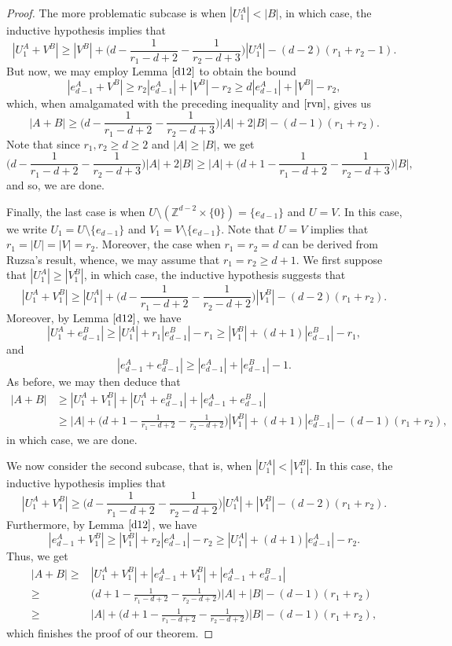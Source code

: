 \begin{proof}
The more problematic subcase is when $|U_1^A| < |B|$, in which case, the inductive hypothesis implies that
\[ |U_1^A + V^B| \geq |V^B| +  \bigg( d - \frac{1}{r_1 - d + 2} - \frac{1}{r_2 - d + 3} \bigg)|U_1^A| - (d-2)(r_1 + r_2-1).  \]
But now, we may employ Lemma $\ref{d12}$ to obtain the bound
\[ |e_{d-1}^A + V^B| \geq r_2 |e_{d-1}^A| + |V^B| - r_2 \geq d |e_{d-1}^A| + |V^B| - r_2, \]
which, when amalgamated with the preceding inequality and $\eqref{rvn}$, gives us
\[ |A+B| \geq \bigg( d - \frac{1}{r_1 - d + 2} - \frac{1}{r_2 - d + 3} \bigg)|A|+ 2|B| - (d-1)(r_1 + r_2). \]
Note that since $r_1, r_2 \geq d \geq 2$ and $|A| \geq |B|$, we get
\[ \bigg( d - \frac{1}{r_1 - d + 2} - \frac{1}{r_2 - d + 3} \bigg)|A|+ 2|B| \geq |A| + \bigg( d+1 - \frac{1}{r_1 - d + 2} - \frac{1}{r_2 - d + 3} \bigg)|B| , \]
and so, we are done.
\par

Finally, the last case is when $U \setminus (\mathbb{Z}^{d-2} \times \{0\}) =  \{e_{d-1}\}$ and $U = V$. In this case, we write $U_1 = U \setminus \{e_{d-1}\}$ and $V_1 = V \setminus \{e_{d-1}\}$. Note that $U=V$ implies that $r_1 = |U| = |V| = r_2$. Moreover, the case when $r_1 = r_2 = d$ can be derived from Ruzsa's result, whence, we may assume that $r_1 = r_2 \geq d+1$. We first suppose that $|U_1^A| \geq |V_1^B|$, in which case, the inductive hypothesis suggests that
\[ |U_1^A + V_1^B| \geq |U_1^A| + \bigg( d - \frac{1}{r_1 - d + 2} - \frac{1}{r_2 - d + 2} \bigg)|V_1^B| - (d-2)(r_1 + r_2).\]
Moreover, by Lemma $\ref{d12}$, we have
\[ |U_1^A + e_{d-1}^B| \geq |U_1^A| + r_1 |e_{d-1}^B| - r_1 \geq |V_1^B| + (d+1)|e_{d-1}^B| - r_1, \]
and
\[ |e_{d-1}^A + e_{d-1}^B| \geq |e_{d-1}^A| + |e_{d-1}^B| - 1. \]
As before, we may then deduce that
\begin{align*}
 |A+B| 
 &  \geq |U_1^A + V_1^B| + |U_1^A + e_{d-1}^B| + |e_{d-1}^A + e_{d-1}^B| \\
 & \geq |A| + \bigg( d +1- \frac{1}{r_1 - d + 2} - \frac{1}{r_2 - d + 2} \bigg)|V_1^B|+ (d+1) |e_{d-1}^B| - (d-1)(r_1 + r_2), 
 \end{align*}
 in which case, we are done. 
 \par
 
We now consider the second subcase, that is, when $|U_1^A| < |V_1^B|$. In this case, the inductive hypothesis implies that
\[ |U_1^A + V_1^B| \geq  \bigg( d - \frac{1}{r_1 - d + 2} - \frac{1}{r_2 - d + 2} \bigg)|U_1^A| +|V_1^B| - (d-2)(r_1 + r_2).\]
Furthermore, by Lemma $\ref{d12}$, we have
\[ | e_{d-1}^A+ V_1^B|  \geq |V_1^B| + r_2 |e_{d-1}^A| - r_2 \geq |U_1^A| + (d+1) |e_{d-1}^A| - r_2. \]
Thus, we get
\begin{align*}
|A+B|
\geq & |U_1^A + V_1^B| + | e_{d-1}^A+ V_1^B| + |e_{d-1}^A + e_{d-1}^B| \\
\geq &  \bigg( d +1 - \frac{1}{r_1 - d + 2} - \frac{1}{r_2 - d + 2} \bigg)|A| + |B| - (d-1)(r_1 + r_2) \\
\geq &  |A| + \bigg( d +1 - \frac{1}{r_1 - d + 2} - \frac{1}{r_2 - d + 2} \bigg) |B| - (d-1)(r_1 + r_2),
\end{align*}
which finishes the proof of our theorem. 
\end{proof}



